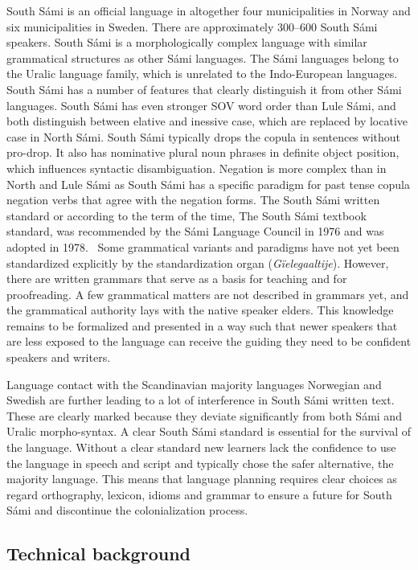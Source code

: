 \documentclass[free]{flammie}
\begin{document}
South Sámi is an official language in altogether four municipalities in Norway
and six municipalities in Sweden. There are approximately 300--600 South Sámi
speakers. South Sámi is a morphologically complex language with similar
grammatical structures as other Sámi languages. The Sámi languages belong to the
Uralic language family, which is unrelated to the Indo-European languages. South
Sámi has a number of features that clearly distinguish it from other Sámi
languages. South Sámi has even stronger SOV word order than Lule Sámi, and both
distinguish between elative and inessive case, which are replaced by locative
case in North Sámi. South Sámi typically drops the copula in sentences without
pro-drop. It also has nominative plural noun phrases in definite object
position, which influences syntactic disambiguation. Negation is more complex
than in North and Lule Sámi as South Sámi has a specific paradigm for past tense
copula negation verbs that agree with the negation forms.  The South Sámi
written standard or according to the term of the time, The South Sámi textbook
standard, was recommended by the Sámi Language Council in 1976 and was adopted
in 1978.~\cite{Bergsland1993} Some grammatical variants and paradigms have not
yet been standardized explicitly by the standardization organ
(\textit{Gïelegaaltije}). However, there are written grammars that serve as a
basis for teaching and for proofreading. A few grammatical matters are not
described in grammars yet, and the grammatical authority lays with the native
speaker elders.  This knowledge remains to be formalized and presented in a way
such that newer speakers that are less exposed to the language can receive the
guiding they need to be confident speakers and writers.

Language contact with the Scandinavian majority languages Norwegian and Swedish
are further leading to a lot of interference in South Sámi written text. These
are clearly marked because they deviate significantly from both Sámi and Uralic
morpho-syntax.  A clear South Sámi standard is essential for the survival of the
language. Without a clear standard new learners lack the confidence to use the
language in speech and script and typically chose the safer alternative, the
majority language.  This means that language planning requires clear choices as
regard orthography, lexicon, idioms and grammar to ensure a future for South
Sámi and discontinue the colonialization process.

\subsection{Technical background}
\end{document}
